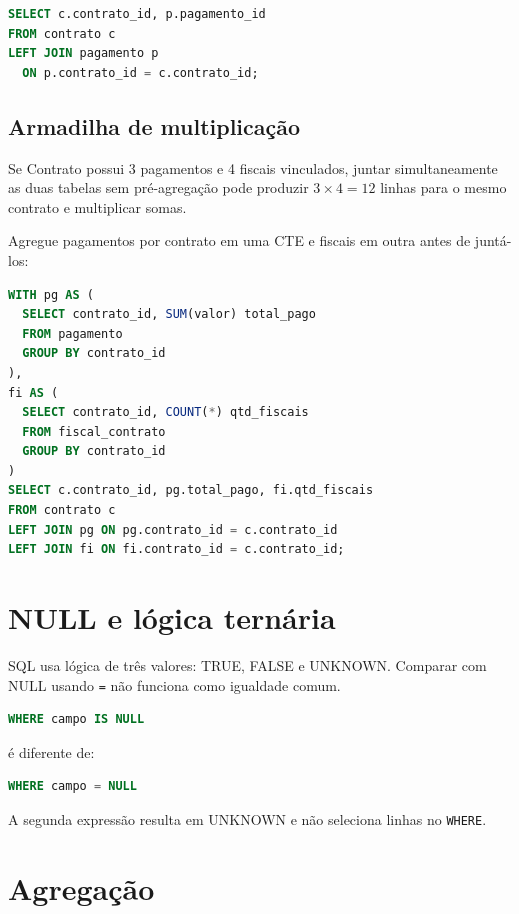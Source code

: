 \begin{lstlisting}[language=SQL]
SELECT c.contrato_id, p.pagamento_id
FROM contrato c
LEFT JOIN pagamento p
  ON p.contrato_id = c.contrato_id;
\end{lstlisting}

\subsection{Armadilha de multiplicação}

Se Contrato possui 3 pagamentos e 4 fiscais vinculados, juntar simultaneamente as duas tabelas sem pré-agregação pode produzir $3\times4=12$ linhas para o mesmo contrato e multiplicar somas.

\begin{exemplo}
Agregue pagamentos por contrato em uma CTE e fiscais em outra antes de juntá-los:
\begin{lstlisting}[language=SQL]
WITH pg AS (
  SELECT contrato_id, SUM(valor) total_pago
  FROM pagamento
  GROUP BY contrato_id
),
fi AS (
  SELECT contrato_id, COUNT(*) qtd_fiscais
  FROM fiscal_contrato
  GROUP BY contrato_id
)
SELECT c.contrato_id, pg.total_pago, fi.qtd_fiscais
FROM contrato c
LEFT JOIN pg ON pg.contrato_id = c.contrato_id
LEFT JOIN fi ON fi.contrato_id = c.contrato_id;
\end{lstlisting}
\end{exemplo}

\section{NULL e lógica ternária}

SQL usa lógica de três valores: TRUE, FALSE e UNKNOWN. Comparar com NULL usando \texttt{=} não funciona como igualdade comum.

\begin{lstlisting}[language=SQL]
WHERE campo IS NULL
\end{lstlisting}

é diferente de:
\begin{lstlisting}[language=SQL]
WHERE campo = NULL
\end{lstlisting}

A segunda expressão resulta em UNKNOWN e não seleciona linhas no \texttt{WHERE}.

\section{Agregação}

